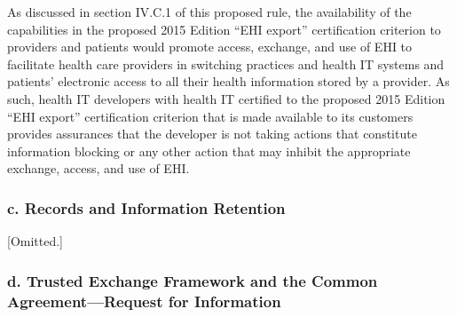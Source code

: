 \documentclass[twoside,11pt]{article}
\begin{document}
          As discussed in section IV.C.1 of this proposed rule, the availability of the capabilities in the proposed 2015 Edition “EHI export” certification criterion to providers and patients would promote access, exchange, and use of EHI to facilitate health care providers in switching practices and health IT systems and patients' electronic access to all their health information stored by a provider. As such, health IT developers with health IT certified to the proposed 2015 Edition “EHI export” certification criterion that is made available to its customers provides assurances that the developer is not taking actions that constitute information blocking or any other action that may inhibit the appropriate exchange, access, and use of EHI.


          \subsubsection{c. Records and Information Retention}

[Omitted.]

          \subsubsection{d. Trusted Exchange Framework and the Common Agreement—Request for Information}
\end{document}
